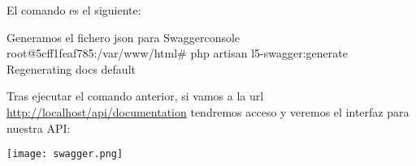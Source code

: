 El comando es el siguiente:

\begin{mycode}{Generamos el fichero json para Swagger}{console}{}
root@5cff1feaf785:/var/www/html# php artisan l5-swagger:generate
Regenerating docs default
\end{mycode}



Tras ejecutar el comando anterior, si vamos a la url \href{http://localhost/api/documentation}{http://localhost/api/documentation} tendremos acceso y veremos el interfaz para nuestra API:

\begin{center}
    \texttt{[image: swagger.png]}
\end{center}











